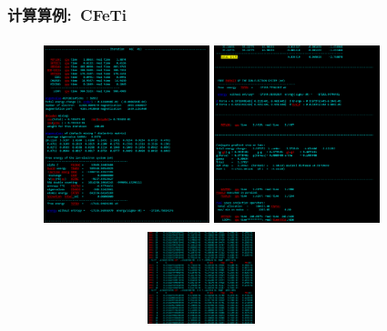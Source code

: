 \begin{frame}
	\frametitle{计算算例:~\textrm{CFeTi}}
\begin{figure}[h!]
\centering
\vskip -0.41in
\includegraphics[height=2.15in,width=1.90in,viewport=0 0 1268 1465,clip]{Figures/VASP_huge_USTB-CFeTi_OUTCAR-2.png}
\includegraphics[height=2.15in,width=1.90in,viewport=0 0 1346 1517,clip]{Figures/VASP_huge_USTB-CFeTi_OUTCAR-1.png}
\includegraphics[height=1.05in,width=3.60in,viewport=0 150 1238 500,clip]{Figures/VASP_huge_USTB-CFeTi_OSZICAR.png}
\label{VASP_Model-2}
\end{figure} 
\end{frame}

